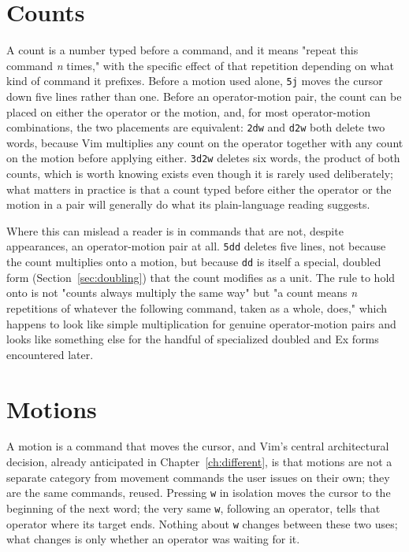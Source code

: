 \section{Counts}

A count is a number typed before a command, and it means "repeat this command \textit{n} times," with the specific effect of that repetition depending on what kind of command it prefixes. Before a motion used alone, \texttt{5j} moves the cursor down five lines rather than one. Before an operator-motion pair, the count can be placed on either the operator or the motion, and, for most operator-motion combinations, the two placements are equivalent: \texttt{2dw} and \texttt{d2w} both delete two words, because Vim multiplies any count on the operator together with any count on the motion before applying either. \texttt{3d2w} deletes six words, the product of both counts, which is worth knowing exists even though it is rarely used deliberately; what matters in practice is that a count typed before either the operator or the motion in a pair will generally do what its plain-language reading suggests.

\label{sec:count-placement}
Where this can mislead a reader is in commands that are not, despite appearances, an operator-motion pair at all. \texttt{5dd} deletes five lines, not because the count multiplies onto a motion, but because \texttt{dd} is itself a special, doubled form (Section~\ref{sec:doubling}) that the count modifies as a unit. The rule to hold onto is not "counts always multiply the same way" but "a count means \textit{n} repetitions of whatever the following command, taken as a whole, does," which happens to look like simple multiplication for genuine operator-motion pairs and looks like something else for the handful of specialized doubled and Ex forms encountered later.

\section{Motions}

A motion is a command that moves the cursor, and Vim's central architectural decision, already anticipated in Chapter~\ref{ch:different}, is that motions are not a separate category from movement commands the user issues on their own; they are the same commands, reused. Pressing \texttt{w} in isolation moves the cursor to the beginning of the next word; the very same \texttt{w}, following an operator, tells that operator where its target ends. Nothing about \texttt{w} changes between these two uses; what changes is only whether an operator was waiting for it.


